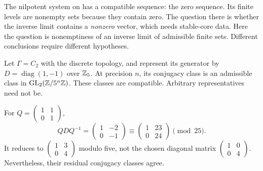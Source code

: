The nilpotent system on  has a compatible sequence: the zero sequence. Its finite levels are nonempty sets because they contain zero. The question there is whether the inverse limit contains a \emph{nonzero} vector, which needs stable-core data. Here the question is nonemptiness of an inverse limit of admissible finite sets. Different conclusions require different hypotheses.


Let $\Gamma=C_2$ with the discrete topology, and represent its generator by $D=\operatorname{diag}(1,-1)$ over $\mathbb Z_5$. At precision $n$, its conjugacy class is an admissible class in $\operatorname{GL}_2(\mathbb Z/5^n\mathbb Z)$. These classes are compatible. Arbitrary representatives need not be.


For $Q=\left(\begin{smallmatrix}1&1\\0&1\end{smallmatrix}\right)$,
\[
QDQ^{-1}=\begin{pmatrix}1&-2\\0&-1\end{pmatrix}
\equiv\begin{pmatrix}1&23\\0&24\end{pmatrix}\pmod{25}.
\]
It reduces to $\left(\begin{smallmatrix}1&3\\0&4\end{smallmatrix}\right)$ modulo five, not the chosen diagonal matrix $\left(\begin{smallmatrix}1&0\\0&4\end{smallmatrix}\right)$. Nevertheless, their residual conjugacy classes agree.

